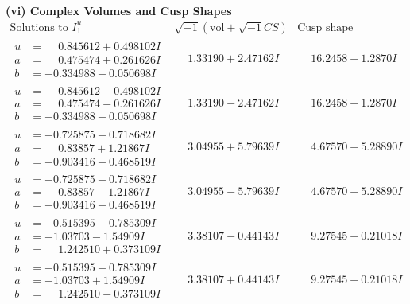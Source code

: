 \documentclass[1p]{elsarticle_modified}
\theoremstyle{definition}
\newcommand{\I}{\sqrt{-1}}
\begin{document}
\newpage\flushleft \textbf{(vi) Complex Volumes and Cusp Shapes}
$$\begin{array}{c|c|c}  
\text{Solutions to }I^u_{1}& \I (\text{vol} + \sqrt{-1}CS) & \text{Cusp shape}\\
 \hline 
\begin{aligned}
u &= \phantom{-}0.845612 + 0.498102 I \\
a &= \phantom{-}0.475474 + 0.261626 I \\
b &= -0.334988 - 0.050698 I\end{aligned}
 & \phantom{-}1.33190 + 2.47162 I & \phantom{-}16.2458 - 1.2870 I \\ \hline\begin{aligned}
u &= \phantom{-}0.845612 - 0.498102 I \\
a &= \phantom{-}0.475474 - 0.261626 I \\
b &= -0.334988 + 0.050698 I\end{aligned}
 & \phantom{-}1.33190 - 2.47162 I & \phantom{-}16.2458 + 1.2870 I \\ \hline\begin{aligned}
u &= -0.725875 + 0.718682 I \\
a &= \phantom{-}0.83857 + 1.21867 I \\
b &= -0.903416 - 0.468519 I\end{aligned}
 & \phantom{-}3.04955 + 5.79639 I & \phantom{-}4.67570 - 5.28890 I \\ \hline\begin{aligned}
u &= -0.725875 - 0.718682 I \\
a &= \phantom{-}0.83857 - 1.21867 I \\
b &= -0.903416 + 0.468519 I\end{aligned}
 & \phantom{-}3.04955 - 5.79639 I & \phantom{-}4.67570 + 5.28890 I \\ \hline\begin{aligned}
u &= -0.515395 + 0.785309 I \\
a &= -1.03703 - 1.54909 I \\
b &= \phantom{-}1.242510 + 0.373109 I\end{aligned}
 & \phantom{-}3.38107 - 0.44143 I & \phantom{-}9.27545 - 0.21018 I \\ \hline\begin{aligned}
u &= -0.515395 - 0.785309 I \\
a &= -1.03703 + 1.54909 I \\
b &= \phantom{-}1.242510 - 0.373109 I\end{aligned}
 & \phantom{-}3.38107 + 0.44143 I & \phantom{-}9.27545 + 0.21018 I \\ \hline\begin{aligned}

\end{aligned}
\end{array}$$
\end{document}
